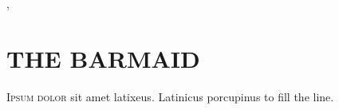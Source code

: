 \@specialfalse
{}
,

\chapter{THE BARMAID}
\begin{multicols}{3}
      \lettrine{I}{psum dolor} sit amet latixeus. \lipsum*[1-2]
      Latinicus porcupinus to fill the line.
\end{multicols}
\clearpage


